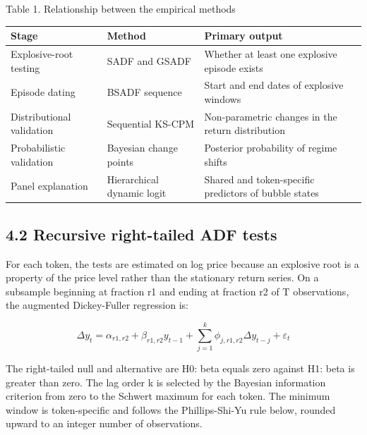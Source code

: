 \documentclass[11pt,a4paper,onecolumn]{article}
\newcommand{\reportcaption}[1]{{\small\raggedright #1\par}\nopagebreak\vspace{3pt}}
\begin{document}
\par\addvspace{5pt}\noindent\begin{minipage}{\linewidth}\reportcaption{Table 1. Relationship between the empirical methods}

\begingroup\small\renewcommand{\arraystretch}{1.18}\setlength{\tabcolsep}{4pt}
\noindent\begin{tabular}{|>{\raggedright\arraybackslash}p{0.224242\dimexpr\linewidth-6\tabcolsep-4\arrayrulewidth\relax}>{\raggedright\arraybackslash}p{0.321212\dimexpr\linewidth-6\tabcolsep-4\arrayrulewidth\relax}>{\raggedright\arraybackslash}p{0.454545\dimexpr\linewidth-6\tabcolsep-4\arrayrulewidth\relax}|}
\hline\rowcolor[HTML]{E8E8E8} \bfseries Stage & \bfseries Method & \bfseries Primary output \\ \hline
Explosive-root testing & SADF and GSADF & Whether at least one explosive episode exists \\ \hline
Episode dating & BSADF sequence & Start and end dates of explosive windows \\ \hline
Distributional validation & Sequential KS-CPM & Non-parametric changes in the return distribution \\ \hline
Probabilistic validation & Bayesian change points & Posterior probability of regime shifts \\ \hline
Panel explanation & Hierarchical dynamic logit & Shared and token-specific predictors of bubble states \\ \hline
\end{tabular}\endgroup\end{minipage}\par\addvspace{5pt}

\subsection{4.2 Recursive right-tailed ADF tests}

For each token, the tests are estimated on log price because an explosive root is a property of the price level rather than the stationary return series. On a subsample beginning at fraction r1 and ending at fraction r2 of T observations, the augmented Dickey-Fuller regression is:

\[
\Delta y_t=\alpha_{r1,r2}+\beta_{r1,r2}y_{t-1}+\sum_{j=1}^{k}\phi_{j,r1,r2}\Delta y_{t-j}+\varepsilon_t
\]

The right-tailed null and alternative are H0: beta equals zero against H1: beta is greater than zero. The lag order k is selected by the Bayesian information criterion from zero to the Schwert maximum for each token. The minimum window is token-specific and follows the Phillips-Shi-Yu rule below, rounded upward to an integer number of observations.
\end{document}
